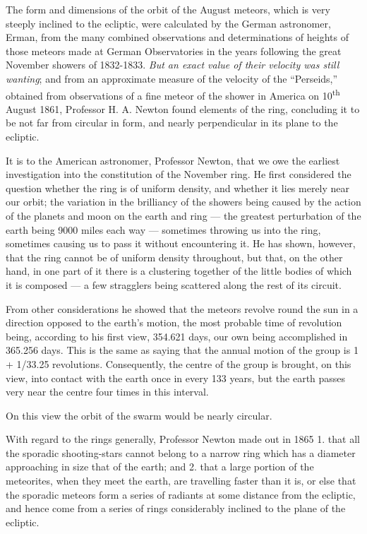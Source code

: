 \documentclass[a4paper, 12pt, oneside, polutonikogreek, english]{article}
\begin{document}
The form and dimensions of the orbit of the August meteors, which is very steeply inclined to the ecliptic, were calculated by the German astronomer, Erman, from the many combined observations and determinations of heights of those meteors made at German Observatories in the years following the great November showers of 1832-1833. \emph{But an exact value of their velocity was still wanting}; and from an approximate measure of the velocity of the ``Perseids,'' obtained from observations of a fine meteor of the shower in America on 10\textsuperscript{th} August 1861, Professor H. A. Newton found elements of the ring, concluding it to be not far from circular in form, and nearly perpendicular in its plane to the ecliptic.

It is to the American astronomer, Professor Newton, that we owe the earliest investigation into the constitution of the November ring. He first considered the question whether the ring is of uniform density, and whether it lies merely near our orbit; the variation in the brilliancy of the showers being caused by the action of the planets and moon on the earth and ring --- the greatest perturbation of the earth being 9000 miles each way --- sometimes throwing us into the ring, sometimes causing us to pass it without encountering it. He has shown, however, that the ring cannot be of uniform density throughout, but that, on the other hand, in one part of it there is a clustering together of the little bodies of which it is composed --- a few stragglers being scattered along the rest of its circuit.

From other considerations he showed that the meteors revolve round the sun in a direction opposed to the earth's motion, the most probable time of revolution being, according to his first view, 354.621 days, our own being accomplished in 365.256 days. This is the same as saying that the annual motion of the group is 1 + 1/33.25 revolutions. Consequently, the centre of the group is brought, on this view, into contact with the earth once in every 133 years, but the earth passes very near the centre four times in this interval.

On this view the orbit of the swarm would be nearly circular.

With regard to the rings generally, Professor Newton made out in 1865 1. that all the sporadic shooting-stars cannot belong to a narrow ring which has a diameter approaching in size that of the earth; and 2. that a large portion of the meteorites, when they meet the earth, are travelling faster than it is, or else that the sporadic meteors form a series of radiants at some distance from the ecliptic, and hence come from a series of rings considerably inclined to the plane of the ecliptic.
\end{document}
